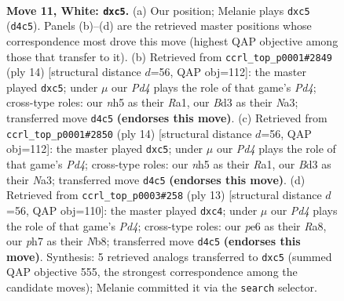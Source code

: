 \documentclass[11pt]{article}
\begin{document}
\clearpage

\begin{figure}[p]\centering
\begin{subfigure}{0.46\textwidth}\centering
\resizebox{\linewidth}{!}{%
\newchessgame
\chessboard[
  setfen={rnbq1rk1/pp3ppp/4p3/2p4n/2PP4/3BPN2/P4PPP/R1BQ1RK1 w - - 1 11},
  showmover=false,
  pgfstyle=straightmove, color=movearrow, markmove={d4-c5}
]}
\caption{}
\end{subfigure}\hfill
\begin{subfigure}{0.46\textwidth}\centering
\resizebox{\linewidth}{!}{%
\newchessgame
\chessboard[
  setfen={rnbq1rk1/pp2ppbp/5np1/2p5/2pP4/N4NP1/PP2PPBP/R1BQ1RK1 w - - 0 8},
  showmover=false,
  pgfstyle=straightmove, color=movearrow, markmove={d4-c5}
]}
\caption{}
\end{subfigure}
\\[4pt]
\begin{subfigure}{0.46\textwidth}\centering
\resizebox{\linewidth}{!}{%
\newchessgame
\chessboard[
  setfen={rnbq1rk1/pp2ppbp/5np1/2p5/2pP4/N4NP1/PP2PPBP/R1BQ1RK1 w - - 0 8},
  showmover=false,
  pgfstyle=straightmove, color=movearrow, markmove={d4-c5}
]}
\caption{}
\end{subfigure}\hfill
\begin{subfigure}{0.46\textwidth}\centering
\resizebox{\linewidth}{!}{%
\newchessgame
\chessboard[
  setfen={rnbq1rk1/pp2ppbp/5np1/2Pp4/2P5/5NP1/PP2PPBP/RNBQ1RK1 b - - 0 7},
  showmover=false,
  pgfstyle=straightmove, color=movearrow, markmove={d5-c4}
]}
\caption{}
\end{subfigure}
\caption{\textbf{Move 11, White: \texttt{dxc5}.} (a) Our position; Melanie plays \texttt{dxc5} (\texttt{d4c5}). Panels (b)--(d) are the retrieved master positions whose correspondence most drove this move (highest QAP objective among those that transfer to it). (b) Retrieved from \texttt{ccrl\_top\_p0001\#2849} (ply 14) [structural distance $d$=56, QAP obj=112]: the master played \texttt{dxc5}; under $\mu$ our \emph{Pd4} plays the role of that game's \emph{Pd4}; cross-type roles: our \emph{n}h5 as their \emph{R}a1, our \emph{B}d3 as their \emph{N}a3; transferred move \texttt{d4c5} \textbf{(endorses this move)}. (c) Retrieved from \texttt{ccrl\_top\_p0001\#2850} (ply 14) [structural distance $d$=56, QAP obj=112]: the master played \texttt{dxc5}; under $\mu$ our \emph{Pd4} plays the role of that game's \emph{Pd4}; cross-type roles: our \emph{n}h5 as their \emph{R}a1, our \emph{B}d3 as their \emph{N}a3; transferred move \texttt{d4c5} \textbf{(endorses this move)}. (d) Retrieved from \texttt{ccrl\_top\_p0003\#258} (ply 13) [structural distance $d$=56, QAP obj=110]: the master played \texttt{dxc4}; under $\mu$ our \emph{Pd4} plays the role of that game's \emph{Pd4}; cross-type roles: our \emph{p}e6 as their \emph{R}a8, our \emph{p}h7 as their \emph{N}b8; transferred move \texttt{d4c5} \textbf{(endorses this move)}. Synthesis: 5 retrieved analogs transferred to \texttt{dxc5} (summed QAP objective 555, the strongest correspondence among the candidate moves); Melanie committed it via the \texttt{search} selector.}
\label{fig:thought-m20}
\end{figure}
\end{document}
